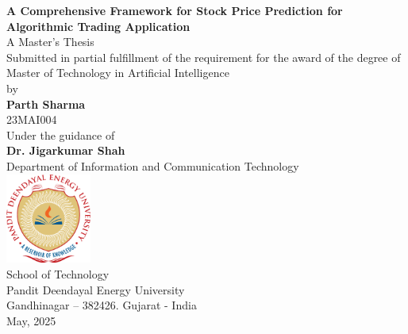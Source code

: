 \begin{titlepage}

\begin{center}
    {{\Large \textbf{A Comprehensive Framework for Stock Price Prediction for Algorithmic Trading Application}}}\\
    \vspace{0.5cm}
    {\large A Master's Thesis}\\
    {\large Submitted in partial fulfillment of the requirement for the award of the degree of}\\
    \vspace{0.3cm}
    {\large Master of Technology in Artificial Intelligence}\\
    {\large by}\\
    \textbf{{\Large  Parth Sharma}}\\
    {\large 23MAI004}\\
    \vspace{0.2cm}
    {\large Under the guidance of}\\
    {\large \textbf{Dr. Jigarkumar Shah}}\\
    {\large Department of Information and Communication Technology}\\
    \vspace{0.1cm}
    \vfill
    {\centering \includegraphics[width=0.21\textwidth]{Images/pdeu_logo.png}}\\
    {\large School of Technology}\\
    {\large Pandit Deendayal Energy University}\\
    {\large Gandhinagar – 382426. Gujarat - India}\\
    {\large May, 2025}
\end{center}
\end{titlepage}